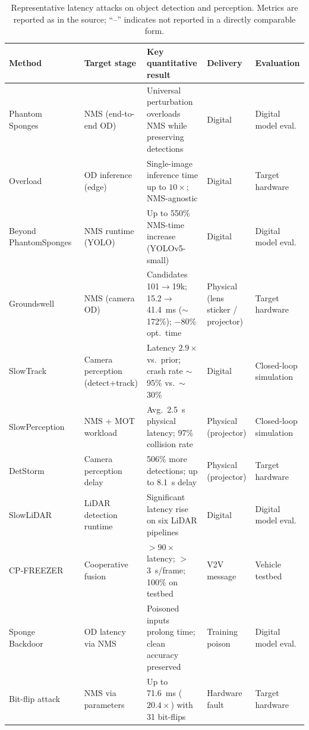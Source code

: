 \documentclass[acmsmall,screen,review,nonacm]{acmart}
\begin{document}
\begin{table}[htbp]
  \caption{Representative latency attacks on object detection and perception. Metrics are reported as in the source; ``--'' indicates not reported in a directly comparable form.}
  \label{tab:od-attacks}
  \small
  \begin{tabularx}{\linewidth}{L{2.3cm} L{2.2cm} X L{1.7cm} L{1.9cm}}
    \toprule
    \textbf{Method} & \textbf{Target stage} & \textbf{Key quantitative result} & \textbf{Delivery} & \textbf{Evaluation} \\
    \midrule
    Phantom Sponges~\cite{shapira2023phantom} & NMS (end-to-end OD) & Universal perturbation overloads NMS while preserving detections & Digital & Digital model eval. \\
    Overload~\cite{chen2024overload} & OD inference (edge) & Single-image inference time up to $10\times$; NMS-agnostic & Digital & Target hardware \\
    Beyond PhantomSponges~\cite{schoof2024beyond} & NMS runtime (YOLO) & Up to 550\% NMS-time increase (YOLOv5-small) & Digital & Digital model eval. \\
    Groundswell~\cite{xia2026groundswell} & NMS (camera OD) & Candidates 101$\to$19k; 15.2$\to$41.4~ms ($\sim$172\%); $-$80\% opt.\ time & Physical (lens sticker / projector) & Target hardware \\
    SlowTrack~\cite{ma2024slowtrack} & Camera perception (detect+track) & Latency $2.9\times$ vs.\ prior; crash rate $\sim$95\% vs.\ $\sim$30\% & Digital & Closed-loop simulation \\
    SlowPerception~\cite{ma2024slowperception} & NMS + MOT workload & Avg.\ 2.5~s physical latency; 97\% collision rate & Physical (projector) & Closed-loop simulation \\
    DetStorm~\cite{muller2025detstorm} & Camera perception delay & 506\% more detections; up to 8.1~s delay & Physical (projector) & Target hardware \\
    SlowLiDAR~\cite{liu2023slowlidar} & LiDAR detection runtime & Significant latency rise on six LiDAR pipelines & Digital & Digital model eval. \\
    CP-FREEZER~\cite{wang2026cpfreezer} & Cooperative fusion & $>90\times$ latency; $>$3~s/frame; 100\% on testbed & V2V message & Vehicle testbed \\
    Sponge Backdoor~\cite{xiao2024sponge} & OD latency via NMS & Poisoned inputs prolong time; clean accuracy preserved & Training poison & Digital model eval. \\
    Bit-flip attack~\cite{sistla2025bitflip} & NMS via parameters & Up to 71.6~ms ($20.4\times$) with 31 bit-flips & Hardware fault & Target hardware \\
    \bottomrule
  \end{tabularx}


\end{table}
\end{document}
